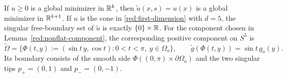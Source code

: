 \begin{proposition}\label{red:suspension}
If $u\geq0$ is a global minimizer in $\mathbb R^k$, then
$\widetilde u(x,s)=u(x)$ is a global minimizer in $\mathbb R^{k+1}$.
If $u$ is the cone in \eqref{red:first-dimension} with $d=5$, the singular
free-boundary set of $\widetilde u$ is exactly $\{0\}\times\mathbb R$.
For the component chosen in Lemma~\ref{red:nonflat-component}, the
corresponding positive component on $S^5$ is
\begin{equation}\label{red:suspension-coordinates}
 \widetilde\Omega
 =\bigl\{\Phi(t,y):=(\sin t\,y,\cos t):
              0<t<\pi,\ y\in\Omega_o\bigr\},
 \qquad
 \widetilde g(\Phi(t,y))=\sin t\,g_o(y).
\end{equation}
Its boundary consists of the smooth side
$\Phi((0,\pi)\times\partial\Omega_o)$ and the two singular tips
$p_+=(0,1)$ and $p_-=(0,-1)$.
\end{proposition}


